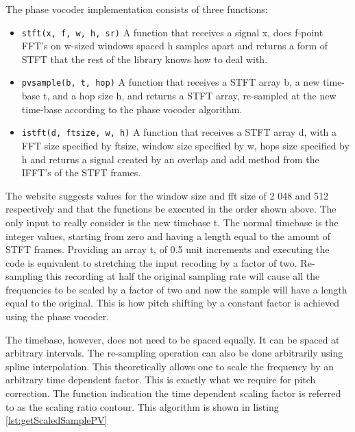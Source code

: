 \vspace{1cm}
The phase vocoder implementation consists of three functions:
\vspace{-1cm}
\begin{itemize}
\item\colorbox{backcolour}{\lstinline{stft(x, f, w, h, sr)}}\newline
A function that receives a signal x, does f-point FFT's on w-sized windows spaced
h samples apart and returns a form of STFT that the rest of the library knows how
to deal with.
\item\colorbox{backcolour}{\lstinline{pvsample(b, t, hop)}}\newline
A function that receives a STFT array b, a new time-base t, and a hop size h,
and returns a STFT array, re-sampled at the new time-base according to the phase
vocoder algorithm.
\item\colorbox{backcolour}{\lstinline{istft(d, ftsize, w, h)}}\newline
A function that receives a STFT array d, with a FFT size specified by ftsize,
window size specified by w, hops size specified by h and returns a signal created
by an overlap and add method from the IFFT's of the STFT frames.
\end{itemize}

The website suggests values for the window size and fft size of 2 048 and 512
respectively and that the functions be executed in the order shown above. The only
input to really consider is the new timebase t. The normal timebase is the
integer values, starting from zero and having a length equal to the amount of STFT
frames. Providing an array t, of 0.5 unit increments and executing the code is
equivalent to stretching the input recoding by a factor of two. Re-sampling this
recording at half the original sampling rate will cause all the frequencies to be
scaled by a factor of two and now the sample will have a length equal to the
original. This is how pitch shifting by a constant factor is achieved using the
phase vocoder.

The timebase, however, does not need to be spaced equally. It can be spaced at
arbitrary intervals. The re-sampling operation can also be done arbitrarily using
spline interpolation. This theoretically allows one to scale the frequency by an
arbitrary time dependent factor. This is exactly what we require for pitch
correction. The function indication the time dependent scaling factor is referred
to as the scaling ratio contour. This algorithm is shown in listing
\ref{lst:getScaledSamplePV}

